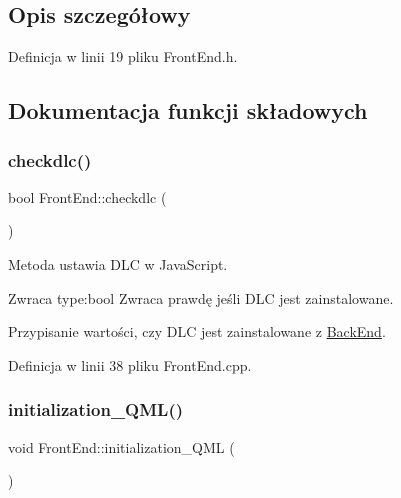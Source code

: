\subsection{Opis szczegółowy}


Definicja w linii 19 pliku Front\+End.\+h.



\subsection{Dokumentacja funkcji składowych}
\mbox{\label{class_front_end_space_1_1_front_end_a8a5435d7eafbd875f277cc388d821fa2}} 
\subsubsection{\texorpdfstring{checkdlc()}{checkdlc()}}
{\footnotesize\ttfamily bool Front\+End\+::checkdlc (\begin{DoxyParamCaption}{ }\end{DoxyParamCaption})}

Metoda ustawia D\+LC w Java\+Script. \begin{DoxyReturn}{Zwraca}
type\+:bool Zwraca prawdę jeśli D\+LC jest zainstalowane. 
\end{DoxyReturn}
Przypisanie wartości, czy D\+LC jest zainstalowane z \hyperlink{class_back_end}{Back\+End}. 

Definicja w linii 38 pliku Front\+End.\+cpp.

\mbox{\label{class_front_end_space_1_1_front_end_ac318233ef4c7e9cb4a2535c3e616b084}} 
\subsubsection{\texorpdfstring{initialization\+\_\+\+Q\+M\+L()}{initialization\_QML()}}
{\footnotesize\ttfamily void Front\+End\+::initialization\+\_\+\+Q\+ML (\begin{DoxyParamCaption}{ }\end{DoxyParamCaption})}

